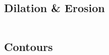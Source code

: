 \documentclass[a4paper, 10pt]{article}
\begin{document}
\begin{lstlisting}[language = C++]

\end{lstlisting}


\subsection{Dilation \& Erosion}


\begin{lstlisting}[language = C++]

\end{lstlisting}


\subsection{Contours}

%

\begin{lstlisting}[language = C++]

\end{lstlisting}
\end{document}
